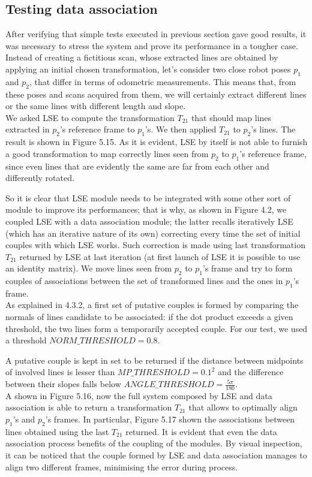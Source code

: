 \documentclass[a4paper, onecolumn]{report}
\begin{document}
\subsection{Testing data association}
After verifying that simple tests executed in previous section gave good results, it was necessary to stress the system and prove its performance in a tougher case. Instead of creating a fictitious scan, whose extracted lines are obtained by applying an initial chosen transformation, let's consider two close robot poses $p_1$ and $p_2$, that differ in terms of odometric measurements. This means that, from these poses and scans acquired from them, we will certainly extract different lines or the same lines with different length and slope. \\ 
We asked LSE to compute the transformation $T_{21}$ that should map lines extracted in $p_2$'s reference frame to $p_1$'s. We then applied $T_{21}$ to $p_2$'s lines. The result is shown in Figure 5.15. As it is evident, LSE by itself is not able to furnish a good transformation to map correctly lines seen from $p_2$ to $p_1$'s reference frame, since even lines that are evidently the same are far from each other and differently rotated. 

So it is clear that LSE module needs to be integrated with some other sort of module to improve its performances; that is why, as shown in Figure 4.2, we coupled LSE with a data association module; the latter recalls iteratively LSE (which has an iterative nature of its own) correcting every time the set of initial couples with which LSE works. Such correction is made using last transformation $T_{21}$ returned by LSE at last iteration (at first launch of LSE it is possible to use an identity matrix). We move lines seen from $p_2$ to $p_1$'s frame and try to form couples of associations between the set of transformed lines and the ones in $p_1$'s frame. \\
As explained in 4.3.2, a first set of putative couples is formed by comparing the normals of lines candidate to be associated: if the dot product exceeds a given threshold, the two lines form a temporarily accepted couple. For our test, we used a threshold $NORM\_THRESHOLD = 0.8$.

A putative couple is kept in set to be returned if the distance between midpoints of involved lines is lesser than $MP\_THRESHOLD = 0.1^2$ and the difference between their slopes falls below $ANGLE\_THRESHOLD = \frac{5\pi}{180}$. \\
A shown in Figure 5.16, now the full system composed by LSE and data association is able to return a transformation $T_{21}$ that allows to optimally align $p_1$'s and $p_2$'s frames. In particular, Figure 5.17 shown the associations between lines obtained using the last $T_{21}$ returned. It is evident that even the data association process benefits of the coupling of the modules. By visual inspection, it can be noticed that the couple formed by LSE and data association manages to align two different frames, minimising the error during process.
\end{document}
